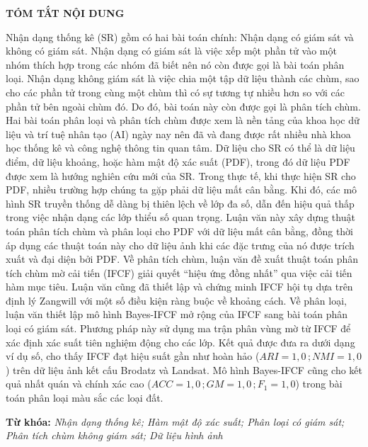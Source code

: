\newpage
\begin{center}
		\vspace*{50pt} %
	{\fontsize{14}{0pt}\selectfont\bf TÓM TẮT NỘI DUNG}
\end{center}
\vspace{20pt}
Nhận dạng thống kê (SR) gồm có hai bài toán chính: Nhận dạng có giám sát và không có
giám sát. Nhận dạng có giám sát là việc xếp một phần tử vào một nhóm thích hợp trong
các nhóm đã biết nên nó còn được gọi là bài toán phân loại. Nhận dạng không giám sát
là việc chia một tập dữ liệu thành các chùm, sao cho các phần tử trong cùng một chùm
thì có sự tương tự nhiều hơn so với các phần tử bên ngoài chùm đó. Do đó, bài toán này
còn được gọi là phân tích chùm. Hai bài toán phân loại và phân tích chùm được xem là
nền tảng của khoa học dữ liệu và trí tuệ nhân tạo (AI) ngày nay nên đã và đang được
rất nhiều nhà khoa học thống kê và công nghệ thông tin quan tâm. Dữ liệu cho SR có
thể là dữ liệu điểm, dữ liệu khoảng, hoặc hàm mật độ xác suất (PDF), trong đó dữ liệu
PDF được xem là hướng nghiên cứu mới của SR. Trong thực tế, khi thực hiện SR cho
PDF, nhiều trường hợp chúng ta gặp phải dữ liệu mất cân bằng. Khi đó, các mô hình SR
truyền thống dễ dàng bị thiên lệch về lớp đa số, dẫn đến hiệu quả thấp trong việc nhận
dạng các lớp thiểu số quan trọng. Luận văn này xây dựng thuật toán phân tích chùm và
phân loại cho PDF với dữ liệu mất cân bằng, đồng thời áp dụng các thuật toán này cho
dữ liệu ảnh khi các đặc trưng của nó được trích xuất và đại diện bởi PDF. Về phân tích
chùm, luận văn đề xuất thuật toán phân tích chùm mờ cải tiến (IFCF) giải quyết “hiệu
ứng đồng nhất” qua việc cải tiến hàm mục tiêu. Luận văn cũng đã thiết lập và chứng
minh IFCF hội tụ dựa trên định lý Zangwill với một số điều kiện ràng buộc về khoảng
cách. Về phân loại, luận văn thiết lập mô hình Bayes-IFCF mở rộng của IFCF sang bài
toán phân loại có giám sát. Phương pháp này sử dụng ma trận phân vùng mờ từ IFCF để
xác định xác suất tiên nghiệm động cho các lớp. Kết quả được đưa ra dưới dạng ví dụ
số, cho thấy IFCF đạt hiệu suất gần như hoàn hảo ($ARI = 1{,}0\,; NMI = 1{,}0$) trên dữ
liệu ảnh kết cấu Brodatz và Landsat. Mô hình Bayes-IFCF cũng cho kết quả nhất quán
và chính xác cao ($ACC = 1{,}0\,; GM = 1{,}0\,; F_1 = 1{,}0$) trong bài toán phân loại màu sắc
các loại đất.

\begin{flushleft}\fontsize{12}{16pt}\selectfont
	\textbf{Từ khóa:} \textit{Nhận dạng thống kê; Hàm mật độ xác suất; Phân loại có giám sát; Phân tích chùm không giám sát; Dữ liệu hình ảnh}
\end{flushleft}



